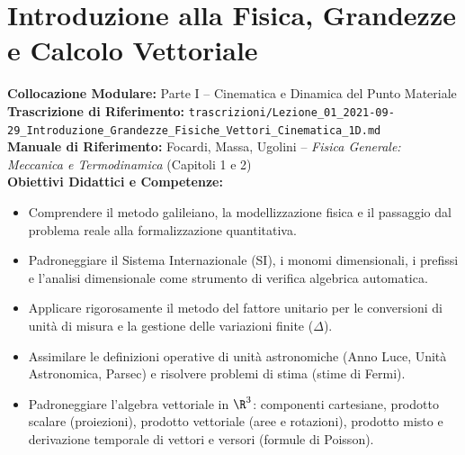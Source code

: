 \chapter{Introduzione alla Fisica, Grandezze e Calcolo Vettoriale}
\label{chap:introduzione_vettori}

\begin{tcolorbox}[enhanced, breakable, colback=navyblue!4!white, colframe=navyblue!80!black,
    coltitle=white, fonttitle=\bfseries\sffamily, title={Quadro Sinottico del Capitolo 01 (Corrispondenza: Lezione 01)},
    sharp corners, rounded corners=south, boxrule=1pt]
\textbf{Collocazione Modulare:} Parte I -- Cinematica e Dinamica del Punto Materiale\\
\textbf{Trascrizione di Riferimento:} \texttt{trascrizioni/Lezione\_01\_2021-09-29\_Introduzione\_Grandezze\_Fisiche\_Vettori\_Cinematica\_1D.md}\\
\textbf{Manuale di Riferimento:} Focardi, Massa, Ugolini -- \emph{Fisica Generale: Meccanica e Termodinamica} (Capitoli 1 e 2)\\
\textbf{Obiettivi Didattici e Competenze:}\par
\begin{itemize}
    \item Comprendere il metodo galileiano, la modellizzazione fisica e il passaggio dal problema reale alla formalizzazione quantitativa.
    \item Padroneggiare il Sistema Internazionale (SI), i monomi dimensionali, i prefissi e l'analisi dimensionale come strumento di verifica algebrica automatica.
    \item Applicare rigorosamente il metodo del fattore unitario per le conversioni di unità di misura e la gestione delle variazioni finite ($\Delta$).
    \item Assimilare le definizioni operative di unità astronomiche (Anno Luce, Unità Astronomica, Parsec) e risolvere problemi di stima (stime di Fermi).
    \item Padroneggiare l'algebra vettoriale in $\R^3$: componenti cartesiane, prodotto scalare (proiezioni), prodotto vettoriale (aree e rotazioni), prodotto misto e derivazione temporale di vettori e versori (formule di Poisson).
\end{itemize}
\end{tcolorbox}

